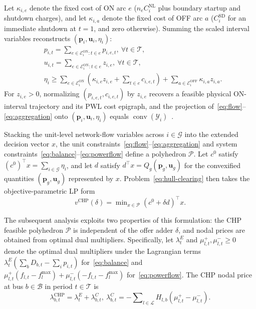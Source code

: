 \documentclass[journal]{IEEEtran}
\DeclareMathOperator{\conv}{conv}
\newcommand{\bp}{\bm p}
\newcommand{\bu}{\bm u}
\newcommand{\CHP}{\mathrm{CHP}}
\begin{document}
Let $\kappa_{i,e}$ denote the fixed cost of ON arc $e$ ($n_e C_i^{\mathrm{NL}}$ plus boundary startup and shutdown charges), and let $\kappa_{i,a}$ denote the fixed cost of OFF arc $a$ ($C_i^{\mathrm{SD}}$ for an immediate shutdown at $t=1$, and zero otherwise). Summing the scaled interval variables reconstructs $(\bp_i,\bu_i,\eta_i)$:
\begin{subequations}\label{eq:aggregation}
\begin{align}
&p_{i,t} = \sum\nolimits_{e\in\mathcal{E}_i^{\mathrm{ON}}:t\in e} p_{i,e,t}, \ \forall t\in\mathcal{T},\label{eq:agg-power}\\
&u_{i,t} = \sum\nolimits_{e\in\mathcal{E}_i^{\mathrm{ON}}:t\in e} z_{i,e}, \ \forall t\in\mathcal{T},\label{eq:agg-status}\\
&\eta_i \!\!\ge\!\! \sum\nolimits_{e\!\in\mathcal{E}_i^{\mathrm{ON}}}\!\!\!\left(\kappa_{i,e}z_{i,e} \!\!+\!\! \sum\nolimits_{t\!\in e}\!\!c_{i,e,t}\right)\!\! +\!\! \sum\nolimits_{a\!\in\mathcal{E}_i^{\mathrm{OFF}}}\!\!\kappa_{i,a}z_{i,a}.\label{eq:agg-cost}
\end{align}
\end{subequations}
For $z_{i,e}>0$, normalizing $(p_{i,e,t},c_{i,e,t})$ by $z_{i,e}$ recovers a feasible physical ON-interval trajectory and its PWL cost epigraph, and the projection of~\eqref{eq:flow}--\eqref{eq:aggregation} onto $(\bp_i,\bu_i,\eta_i)$ equals $\conv(\mathcal{Y}_i)$~\cite{pan2018,networkflow}.

Stacking the unit-level network-flow variables across $i\in\mathcal{G}$ into the extended decision vector $x$, the unit constraints~\eqref{eq:flow}--\eqref{eq:aggregation} and system constraints~\eqref{eq:balance}--\eqref{eq:powerflow} define a polyhedron $\mathcal{P}$. Let $c^0$ satisfy $(c^0)^\top x\!\!=\!\!\sum\nolimits_{i\in\mathcal{G}}\eta_i$, and let $d$ satisfy $d^\top x\!\!=\!\!Q_g(\bp_g,\bu_g)$ for the convexified quantities $(\bp_g,\bu_g)$ represented by $x$. Problem~\eqref{eq:hull-clearing} then takes the objective-parametric LP form
\begin{equation}
v^{\CHP}(\delta) = \min\nolimits_{x\in\mathcal{P}} (c^0 + \delta d)^\top x.\label{eq:paramlp}
\end{equation}

The subsequent analysis exploits two properties of this formulation: the CHP feasible polyhedron $\mathcal{P}$ is independent of the offer adder $\delta$, and nodal prices are obtained from optimal dual multipliers. 
Specifically, let $\lambda_t^E$ and $\mu_{l,t}^{+},\mu_{l,t}^{-}\ge 0$ denote the optimal dual multipliers under the Lagrangian terms $\lambda_t^E(\sum_b D_{b,t}-\sum_i p_{i,t})$ for~\eqref{eq:balance} and $\mu_{l,t}^{+}(f_{l,t}-f_l^{\max})+\mu_{l,t}^{-}(-f_{l,t}-f_l^{\max})$ for~\eqref{eq:powerflow}. The CHP nodal price at bus $b\in\mathcal{B}$ in period $t\in\mathcal{T}$ is
\begin{equation}
\lambda_{b,t}^{\CHP} = \lambda_t^E + \lambda_{b,t}^C, \
\lambda_{b,t}^C = -\sum\nolimits_{l\in\mathcal{L}} H_{l,b}\!\left(\mu_{l,t}^{+}-\mu_{l,t}^{-}\right).\label{eq:lmp}
\end{equation}
\end{document}
